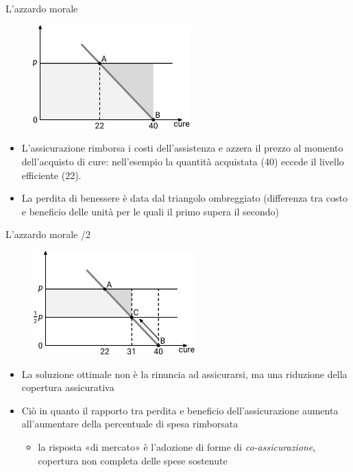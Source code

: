 \documentclass[aspectratio=64,12pt]{beamer}
\begin{document}
\begin{frame}{L'azzardo morale}
\begin{figure}[htbp]
\centering
\includegraphics[height=4cm]{./figure/moral-hazard-2.pdf}
\end{figure}

\begin{itemize}
\item L'assicurazione rimborsa i costi dell'assistenza e azzera il prezzo al
momento dell'acquisto di cure: nell'esempio la quantità acquistata (40)
eccede il livello efficiente (22).
\item La perdita di benessere è data dal triangolo ombreggiato (differenza tra
costo e beneficio delle unità per le quali il primo supera il secondo)
\end{itemize}
\end{frame}


\begin{frame}{L'azzardo morale /2}
\begin{figure}[htbp]
\centering
\includegraphics[height=4cm]{./figure/moral-hazard-3.pdf}
\end{figure}

\begin{itemize}
\item La soluzione ottimale non è la rinuncia ad assicurarsi, ma una riduzione
della copertura assicurativa
\item Ciò in quanto il rapporto tra perdita e beneficio dell'assicurazione aumenta
all'aumentare della percentuale di spesa rimborsata
\begin{itemize}
\item la risposta «di mercato» è l'adozione di forme di \emph{co-assicurazione},
copertura non completa delle spese sostenute
\end{itemize}
\end{itemize}
\end{frame}
\end{document}
